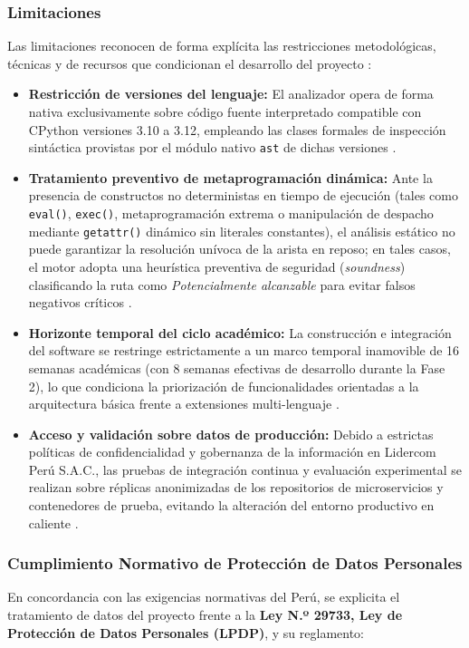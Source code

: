 \subsubsection{Limitaciones}
Las limitaciones reconocen de forma explícita las restricciones metodológicas, técnicas y de recursos que condicionan el desarrollo del proyecto \parencite{sommerville2016software, torres2026proyecto}: %
\begin{itemize}[leftmargin=1.27cm]
    \item \textbf{Restricción de versiones del lenguaje:} El analizador opera de forma nativa exclusivamente sobre código fuente interpretado compatible con CPython versiones 3.10 a 3.12, empleando las clases formales de inspección sintáctica provistas por el módulo nativo \texttt{ast} de dichas versiones \parencite{salis2021pycg}. %
    \item \textbf{Tratamiento preventivo de metaprogramación dinámica:} Ante la presencia de constructos no deterministas en tiempo de ejecución (tales como \texttt{eval()}, \texttt{exec()}, metaprogramación extrema o manipulación de despacho mediante \texttt{getattr()} dinámico sin literales constantes), el análisis estático no puede garantizar la resolución unívoca de la arista en reposo; en tales casos, el motor adopta una heurística preventiva de seguridad (\textit{soundness}) clasificando la ruta como \textit{Potencialmente alcanzable} para evitar falsos negativos críticos \parencite{nielson1999principles, salis2021pycg}. %
    \item \textbf{Horizonte temporal del ciclo académico:} La construcción e integración del software se restringe estrictamente a un marco temporal inamovible de 16 semanas académicas (con 8 semanas efectivas de desarrollo durante la Fase 2), lo que condiciona la priorización de funcionalidades orientadas a la arquitectura básica frente a extensiones multi-lenguaje \parencite{torres2026proyecto}. %
    \item \textbf{Acceso y validación sobre datos de producción:} Debido a estrictas políticas de confidencialidad y gobernanza de la información en Lidercom Perú S.A.C., las pruebas de integración continua y evaluación experimental se realizan sobre réplicas anonimizadas de los repositorios de microservicios y contenedores de prueba, evitando la alteración del entorno productivo en caliente \parencite{gutierrez2024auditoria}. %
\end{itemize}

\subsubsection{Cumplimiento Normativo de Protección de Datos Personales}
En concordancia con las exigencias normativas del Perú, se explicita el tratamiento de datos del proyecto frente a la \textbf{Ley N.º 29733, Ley de Protección de Datos Personales (LPDP)}, y su reglamento: %

